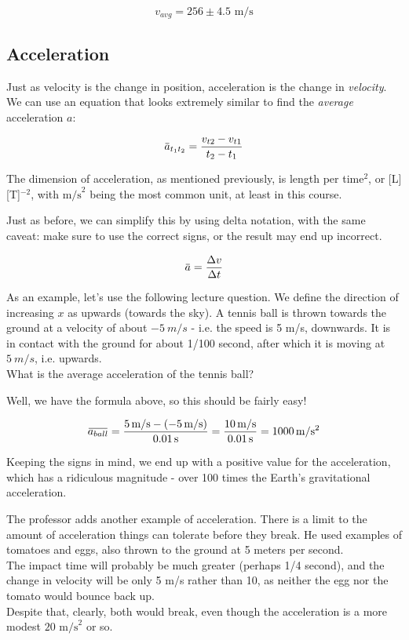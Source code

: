 \documentclass[12pt,a4paper]{report}
\newcommand{\overbar}[1]{\mkern 1.5mu\overline{\mkern-1.5mu#1\mkern-1.5mu}\mkern 1.5mu}
\begin{document}
\begin{equation}
v_{avg} = 256 \pm 4.5 \text{ m/s}
\end{equation}

\subsection{Acceleration}

Just as velocity is the change in position, acceleration is the change in \emph{velocity}. We can use an equation that looks extremely similar to find the \emph{average} acceleration $a$:

\begingroup
\large
\begin{equation}
 \overbar{a}_{t_1 t_2} = \frac{v_{t2} - v_{t1}}{t_2 - t_1}
\end{equation}
\endgroup

The dimension of acceleration, as mentioned previously, is length per time${}^2$, or [L] [T]${}^{-2}$, with $\text{m/s}^2$ being the most common unit, at least in this course.

Just as before, we can simplify this by using delta notation, with the same caveat: make sure to use the correct signs, or the result may end up incorrect.

\begin{equation}
\overbar{a} = \frac{\Delta v}{\Delta t}
\end{equation}

As an example, let's use the following lecture question. We define the direction of increasing $x$ as upwards (towards the sky). A tennis ball is thrown towards the ground at a velocity of about $\SI{-5}{m/s}$ - i.e. the speed is 5 m/s, downwards. It is in contact with the ground for about 1/100 second, after which it is moving at $\SI{+5}{m/s}$, i.e. upwards.\\
What is the average acceleration of the tennis ball?

Well, we have the formula above, so this should be fairly easy!

\begin{equation}
 \overbar{a_{ball}} = \frac{\SI{5}{m/s} - (\SI{-5}{m/s})}{\SI{0.01}{s}} = \frac{\SI{10}{m/s}}{\SI{0.01}{s}} = \SI{1000}{m/s^2}
\end{equation}

Keeping the signs in mind, we end up with a positive value for the acceleration, which has a ridiculous magnitude - over 100 times the Earth's gravitational acceleration.

The professor adds another example of acceleration. There is a limit to the amount of acceleration things can tolerate before they break. He used examples of tomatoes and eggs, also thrown to the ground at 5 meters per second.\\
The impact time will probably be much greater (perhaps 1/4 second), and the change in velocity will be only 5 m/s rather than 10, as neither the egg nor the tomato would bounce back up.\\
Despite that, clearly, both would break, even though the acceleration is a more modest $20 \text{ m/s}^2$ or so.
\end{document}
